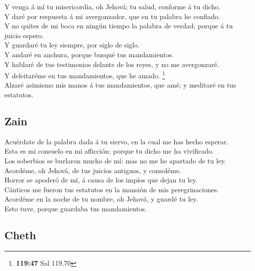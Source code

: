  Y venga á mí tu misericordia, oh Jehová; tu salud,
conforme á tu dicho.\\
 Y daré por respuesta á mi avergonzador, que en tu palabra
he confiado.\\
 Y no quites de mi boca en ningún tiempo la palabra de
verdad; porque á tu juicio espero.\\
 Y guardaré tu ley siempre, por siglo de siglo.\\
 Y andaré en anchura, porque busqué tus mandamientos.\\
 Y hablaré de tus testimonios delante de los reyes, y no me
avergonzaré.\\
 Y deleitaréme en tus mandamientos, que he amado.
\footnote{\textbf{119:47} Sal 119,70}\\
 Alzaré asimismo mis manos á tus mandamientos, que amé; y
meditaré en tus estatutos.

\hypertarget{zain}{%
\subsection{Zain}\label{zain}}

 Acuérdate de la palabra dada á tu siervo, en la cual me
has hecho esperar.\\
 Esta es mi consuelo en mi aflicción: porque tu dicho me ha
vivificado.\\
 Los soberbios se burlaron mucho de mí: mas no me he
apartado de tu ley.\\
 Acordéme, oh Jehová, de tus juicios antiguos, y
consoléme.\\
 Horror se apoderó de mí, á causa de los impíos que dejan
tu ley.\\
 Cánticos me fueron tus estatutos en la mansión de mis
peregrinaciones.\\
 Acordéme en la noche de tu nombre, oh Jehová, y guardé tu
ley.\\
 Esto tuve, porque guardaba tus mandamientos.

\hypertarget{cheth}{%
\subsection{Cheth}\label{cheth}}

